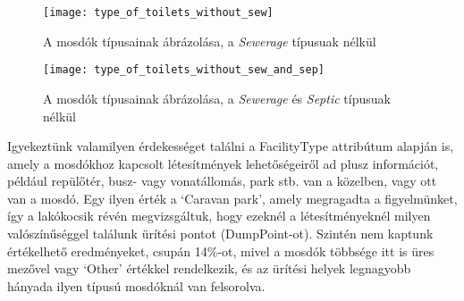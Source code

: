 	\begin{figure}[!ht]
		\centering	
			\texttt{[image: type\_of\_toilets\_without\_sew]}
			\caption{A mosdók típusainak ábrázolása, a \textit{Sewerage} típusuak nélkül}
	\end{figure}
	\begin{figure}[!ht]
		\centering	
			\texttt{[image: type\_of\_toilets\_without\_sew\_and\_sep]}
			\caption{A mosdók típusainak ábrázolása, a \textit{Sewerage} és \textit{Septic} típusuak nélkül}
	\end{figure}
	Igyekeztünk valamilyen érdekességet találni a FacilityType attribútum alapján is, amely a mosdókhoz kapcsolt létesítmények lehetőségeiről ad plusz információt, például repülőtér, busz- vagy vonatállomás, park stb. van a közelben, vagy ott van a mosdó. Egy ilyen érték a ‘Caravan park’, amely megragadta a figyelmünket, így a lakókocsik révén megvizsgáltuk, hogy ezeknél a létesítményeknél milyen valószínűséggel találunk ürítési pontot (DumpPoint-ot). Szintén nem kaptunk értékelhető eredményeket, csupán 14\%-ot, mivel a mosdók többsége itt is üres mezővel vagy ‘Other’ értékkel rendelkezik, és az ürítési helyek legnagyobb hányada ilyen típusú mosdóknál van felsorolva.

	
	
